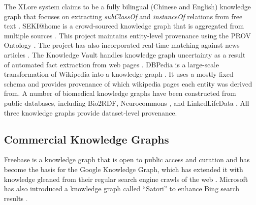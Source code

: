 The XLore system claims to be a fully bilingual (Chinese and English) knowledge graph that focuses on extracting \emph{subClassOf} and \emph{instanceOf} relations from free text \cite{wang2013xlore}.
SEKI@home is a crowd-sourced knowledge graph that is aggregated from multiple sources \cite{steiner2012seki}.
This project maintains entity-level provenance using the PROV Ontology \cite{Moreau_2015}.
The project has also incorporated real-time matching against news articles \cite{steiner_iswc_2012}.
The Knowledge Vault handles knowledge graph uncertainty as a result of automated fact extraction from web pages \cite{Dong_2014}.
DBPedia is a large-scale transformation of Wikipedia into a knowledge graph \cite{Bizer_2009}.
It uses a mostly fixed schema and provides provenance of which wikipedia pages each entity was derived from.
A number of biomedical knowledge graphs have been constructed from public databases, including Bio2RDF\cite{Callahan_2013}, Neurocommons \cite{Ruttenberg_2009}, and LinkedLifeData \cite{momtchev2009expanding}.
All three knowledge graphs provide dataset-level provenance.

\subsection{Commercial Knowledge Graphs}
Freebase is a knowledge graph that is open to public access and curation \cite{Bollacker_2008} and has become the basis for the Google Knowledge Graph, which has extended it with knowledge gleaned from their regular search engine crawls of the web \cite{singhal2012introducing}.
Microsoft has also introduced a knowledge graph called ``Satori'' to enhance Bing search results \cite{qian2013understand}.

